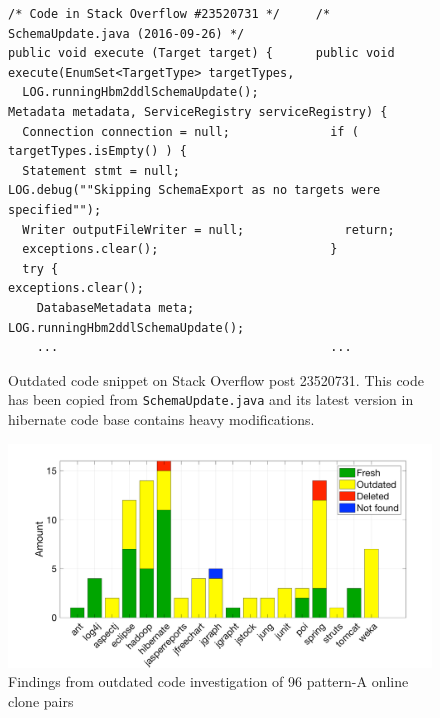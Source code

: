 \documentclass[sigconf,review, anonymous]{acmart}
\begin{document}
\begin{figure}
	\begin{lstlisting}
/* Code in Stack Overflow #23520731 */     /* SchemaUpdate.java (2016-09-26) */
public void execute (Target target) {      public void execute(EnumSet<TargetType> targetTypes, 
  LOG.runningHbm2ddlSchemaUpdate();                        Metadata metadata, ServiceRegistry serviceRegistry) {
  Connection connection = null;              if ( targetTypes.isEmpty() ) {
  Statement stmt = null;                       LOG.debug(""Skipping SchemaExport as no targets were specified"");
  Writer outputFileWriter = null;              return;
  exceptions.clear();                        }
  try {                                      exceptions.clear();
    DatabaseMetadata meta;                   LOG.runningHbm2ddlSchemaUpdate();
    ...                                      ...
	\end{lstlisting}
	\caption{Outdated code snippet on Stack Overflow post 23520731. This code has been copied from \texttt{SchemaUpdate.java} and its latest version in hibernate code base contains heavy modifications.}
	\label{fig:hibernate_outdated_code}
\end{figure}

\begin{figure}
	\centering
	\includegraphics[width=\linewidth]{outdated}
	\caption{Findings from outdated code investigation of 96 pattern-A online clone pairs}
	\label{fig:outdated}
\end{figure}
\end{document}
